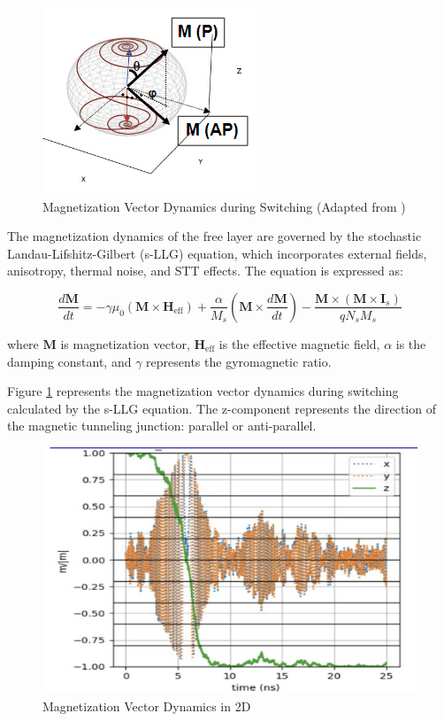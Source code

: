 \documentclass[conference]{IEEEtran}
\begin{document}
\begin{figure}
    \centering
    \includegraphics[width=0.6\linewidth]{Magnetization Vector Dynamics during Switching.png}
    \caption{Magnetization Vector Dynamics during Switching (Adapted from \cite{garcia-redondo_compact_2021}) }
    \label{fig:magnetization-sphere}
\end{figure}


The magnetization dynamics of the free layer are governed by the stochastic Landau-Lifshitz-Gilbert (s-LLG) equation, which incorporates external fields, anisotropy, thermal noise, and STT effects. The equation is expressed as:

\[
\frac{d\mathbf{M}}{dt} = -\gamma \mu_0 \left( \mathbf{M} \times \mathbf{H}_{\text{eff}} \right) + \frac{\alpha}{M_s} \left( \mathbf{M} \times \frac{d\mathbf{M}}{dt} \right) - \frac{\mathbf{M} \times (\mathbf{M} \times \mathbf{I}_s)}{q N_s M_s}
\] \cite{ament_solving_2017}

where \(\mathbf{M}\)  is magnetization vector, \(\mathbf{H}_{\text{eff}}\) is the effective magnetic field, \(\alpha\) is the damping constant, and \(\gamma\) represents the gyromagnetic ratio.

Figure \ref{fig:magnetization-sphere} represents the magnetization vector dynamics during switching calculated by the s-LLG equation. The z-component represents the direction of the magnetic tunneling junction: parallel or anti-parallel.  


\begin{figure}
    \centering
    \includegraphics[width=1.0\linewidth]{Magnetization Vector Dynamics_2.png}
    \caption{Magnetization Vector Dynamics in 2D}
    \label{fig:vect-dynamics}
\end{figure}
\end{document}
